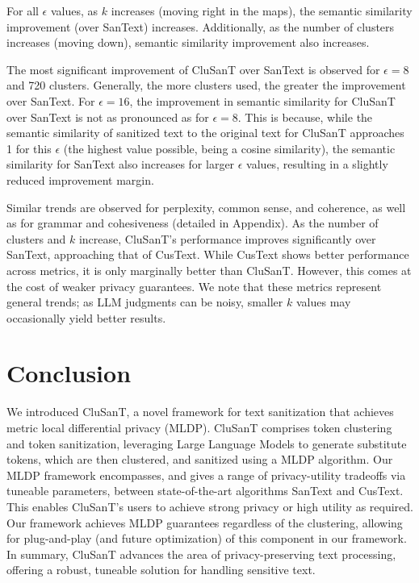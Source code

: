 \documentclass[11pt]{article}
\newcommand{\clusant}{CluSanT\xspace}
\begin{document}
For all $\epsilon$ values, as $k$ increases (moving right in the maps), the semantic similarity improvement (over SanText) increases. Additionally, as the number of clusters increases (moving down), semantic similarity improvement also increases.

The most significant improvement of \clusant over SanText is observed for $\epsilon = 8$ and 720 clusters. Generally, the more clusters used, the greater the improvement over SanText. For $\epsilon = 16$, the improvement in semantic similarity for \clusant over SanText is not as pronounced as for $\epsilon = 8$. This is because, while the semantic similarity of sanitized text to the original text for \clusant approaches 1 for this $\epsilon$ (the highest value possible, being a cosine similarity), the semantic similarity for SanText also increases for larger $\epsilon$ values, resulting in a slightly reduced improvement margin.

Similar trends are observed for perplexity, common sense, and coherence, as well as for grammar and cohesiveness (detailed in Appendix). As the number of clusters and $k$ increase, \clusant's performance improves significantly over SanText, approaching that of CusText. While CusText shows better performance across metrics, it is only marginally better than \clusant. However, this comes at the cost of weaker privacy guarantees.
We note that these metrics represent general trends; as LLM judgments can be noisy, smaller $k$ values may occasionally yield better results.




\section{Conclusion}
We introduced \clusant, a novel framework for text sanitization that achieves metric local differential privacy (MLDP). %
\clusant comprises token clustering and token sanitization, leveraging Large Language Models to generate substitute tokens, which are then clustered, and sanitized using a MLDP algorithm.
Our MLDP framework encompasses, and gives a range of privacy-utility tradeoffs via tuneable parameters,  between state-of-the-art algorithms  SanText and CusText. %
This enables \clusant's users to achieve strong privacy or high utility as required. 
Our framework achieves MLDP guarantees regardless of the clustering, allowing for plug-and-play (and future optimization) of %
this component in our framework. 
In summary, \clusant advances the area of privacy-preserving text processing, 
offering a robust, tuneable solution for handling sensitive text. %
\end{document}
